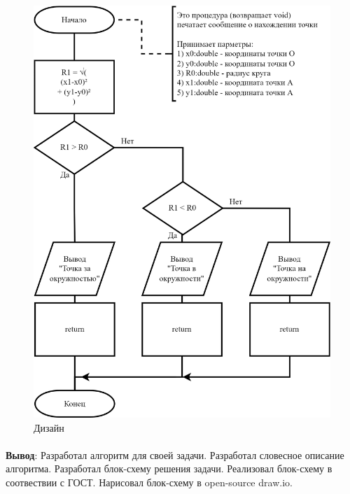 \documentclass[12pt, a4paper, simple]{eskdtext}
\begin{document}
\begin{figure}[!ph]
    \centering
    \includegraphics[]
    {../sources/flowcharts/5.png}
    \caption{Дизайн}
    \label{fig:5}
\end{figure}

\paragraph{} \textbf{Вывод}:
Разработал алгоритм для своей задачи.
Разработал словесное описание алгоритма.
Разработал блок-схему решения задачи.
Реализовал блок-схему в соотвествии с ГОСТ.
Нарисовал блок-схему в open-source draw.io.

\newpage
\end{document}
